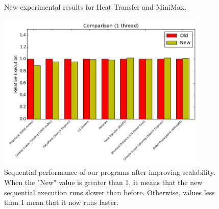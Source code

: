 \documentclass[10pt]{article}
\begin{document}
\begin{figure}[h]
\begin{center}
\end{center}
\begin{center}
\end{center}
\caption{New experimental results for Heat Transfer and MiniMax.}
\label{fig:res3}
\end{figure}

\begin{figure}[b]
\begin{center}
   \includegraphics[width=0.9\textwidth]{figures/comparison1}
\end{center}
\caption{Sequential performance of our programs after improving scalability.
   When the "New" value is greater than 1, it means that the new sequential
   execution runs slower than before. Otherwise, values less than 1 mean that it
   now runs faster.}
\label{fig:seq}
\end{figure}
\end{document}
